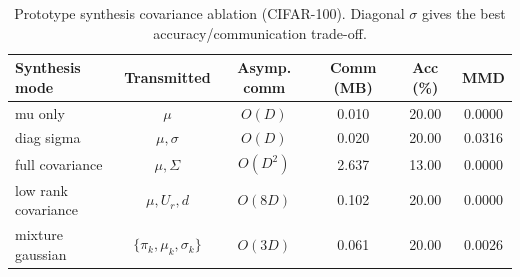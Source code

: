\begin{table}[t]
\centering
\caption{Prototype synthesis covariance ablation (CIFAR-100). Diagonal $\sigma$ gives the best accuracy/communication trade-off.}
\label{tab:covariance}
\begin{tabular}{lccccc}
\toprule
Synthesis mode & Transmitted & Asymp. comm & Comm (MB) & Acc (\%) & MMD \\
\midrule
mu only & $\mu$ & $O(D)$ & 0.010 & 20.00 & 0.0000 \\
diag sigma & $\mu,\sigma$ & $O(D)$ & 0.020 & 20.00 & 0.0316 \\
full covariance & $\mu,\Sigma$ & $O(D^2)$ & 2.637 & 13.00 & 0.0000 \\
low rank covariance & $\mu,U_r,d$ & $O(8D)$ & 0.102 & 20.00 & 0.0000 \\
mixture gaussian & $\{\pi_k,\mu_k,\sigma_k\}$ & $O(3D)$ & 0.061 & 20.00 & 0.0026 \\
\bottomrule
\end{tabular}
\end{table}
